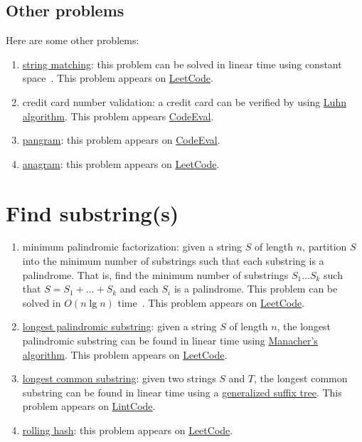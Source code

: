 \subsection{Other problems}
Here are some other problems:
\begin{enumerate}
\item \href{https://en.wikipedia.org/wiki/String_searching_algorithm}{string matching}: this problem can be solved in linear time using constant space~\cite{Rytter2003}. This problem appears on \href{https://leetcode.com/problems/implement-strstr/}{LeetCode}.
\item credit card number validation: a credit card can be verified by using \href{https://en.wikipedia.org/wiki/Luhn_algorithm}{Luhn algorithm}. This problem appears \href{https://www.codeeval.com/open_challenges/172/}{CodeEval}.
\item \href{https://en.wikipedia.org/wiki/Pangram}{pangram}: this problem appears on \href{https://www.codeeval.com/public_sc/37/}{CodeEval}.
\item \href{https://en.wikipedia.org/wiki/Anagram}{anagram}: this problem appears on \href{https://leetcode.com/problems/valid-anagram/}{LeetCode}.
\end{enumerate}

\section{Find substring(s)}

\begin{enumerate}
\item minimum palindromic factorization: given a string $S$ of length $n$, partition $S$ into the minimum number of substrings such that each substring is a palindrome.
That is, find the minimum number of substrings $S_1 \dots S_k$ such that $S = S_1 + \dots + S_k$ and each $S_i$ is a palindrome. This problem can be solved in $O(n \lg n)$ time~\cite{Fici2014,Rubinchik2015}.
This problem appears on \href{https://leetcode.com/problems/palindrome-partitioning-ii/}{LeetCode}.
\item \href{https://en.wikipedia.org/wiki/Longest_palindromic_substring}{longest palindromic substring}: given a string $S$ of length $n$, the longest palindromic substring can be found in linear time using \href{https://en.wikipedia.org/wiki/Longest_palindromic_substring#Manacher.27s_algorithm}{Manacher's algorithm}.
This problem appears on \href{https://leetcode.com/problems/longest-palindromic-substring/}{LeetCode}.
\item \href{https://en.wikipedia.org/wiki/Longest_common_substring_problem}{longest common substring}: given two strings $S$ and $T$, the longest common substring can be found in linear time using a \href{https://en.wikipedia.org/wiki/Longest_common_substring_problem}{generalized suffix tree}. This problem appears on \href{http://www.lintcode.com/en/problem/longest-common-subsequence/}{LintCode}.
\item \href{https://en.wikipedia.org/wiki/Rolling_hash}{rolling hash}: this problem appears on \href{https://leetcode.com/problems/repeated-dna-sequences/}{LeetCode}.
\end{enumerate}

